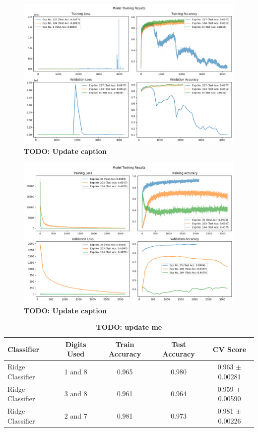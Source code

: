 \documentclass[11pt]{amsart}
\begin{document}
\begin{figure}[h]
	\centering
	\includegraphics[width=.9\textwidth]{../visualizations/model_training_results_vis_1.png}
 	\caption{\textbf{TODO: Update caption}}\label{fig:f2}
\end{figure}

\begin{figure}[h]
	\centering
	\includegraphics[width=.9\textwidth]{../visualizations/model_training_results_vis_2.png}
 	\caption{\textbf{TODO: Update caption}}\label{fig:f3}
\end{figure}

\begin{table}[h]
    \centering
    \begin{tabular}{|l|c|c|c|c|} %
        \hline
        \textbf{Classifier} & \textbf{Digits Used} & \textbf{Train Accuracy} & \textbf{Test Accuracy} & \textbf{CV Score} \\ 
        \hline
        Ridge Classifier & 1 and 8 & 0.965  & 0.980 & 0.963 $\pm$ 0.00281 \\
        \hline
        Ridge Classifier & 3 and 8 & 0.961  & 0.964 & 0.959 $\pm$ 0.00590 \\
        \hline
        Ridge Classifier & 2 and 7 & 0.981  & 0.973 & 0.981 $\pm$ 0.00226 \\  
        \hline
    \end{tabular}
    \caption{\textbf{TODO: update me}}
    \label{tab:tab0}
\end{table}
\end{document}
